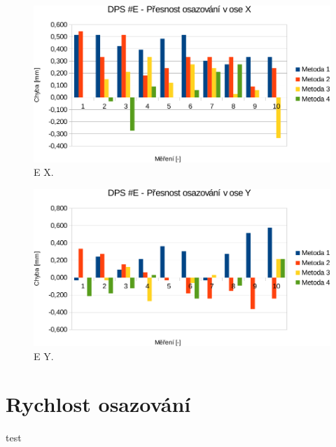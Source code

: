 \begin{figure}[H]
  \centering
    \includegraphics[width=0.9\linewidth]{pdf/E_X-crop2.pdf}%
    \caption{E X.}
    \label{graf:EX}
\end{figure}
\begin{figure}[H]
  \centering
    \includegraphics[width=0.9\linewidth]{pdf/E_Y-crop2.pdf}%
    \caption{E Y.}
    \label{graf:EY}
\end{figure}

\section{Rychlost osazování}
test
